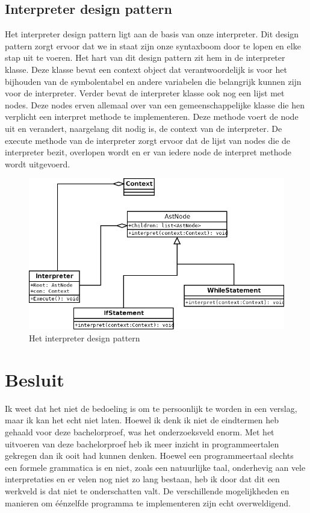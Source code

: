 \documentclass[11pt,a4paper]{article}
\begin{document}
\subsection{Interpreter design pattern}
Het interpreter design pattern ligt aan de basis van onze interpreter. Dit design pattern zorgt ervoor dat we in staat zijn onze syntaxboom door te lopen en elke stap uit te voeren. Het hart van dit design pattern zit hem in de interpreter klasse. Deze klasse bevat een context object dat verantwoordelijk is voor het bijhouden van de symbolentabel en andere variabelen die belangrijk kunnen zijn voor de interpreter. Verder bevat de interpreter klasse ook nog een lijst met nodes. Deze nodes erven allemaal over van een gemeenschappelijke klasse die hen verplicht een interpret methode te implementeren. Deze methode voert de node uit en verandert, naargelang dit nodig is, de context van de interpreter. De execute methode van de interpreter zorgt ervoor dat de lijst van nodes die de interpreter bezit, overlopen wordt en er van iedere node de interpret methode wordt uitgevoerd.

\begin{figure}[ht]
\centering
\includegraphics[width=\textwidth]{afbeeldingen/interpreter_small}
\caption{Het interpreter design pattern}
\end{figure}

\section{Besluit}
Ik weet dat het niet de bedoeling is om te persoonlijk te worden in een verslag, maar ik kan het echt niet laten. Hoewel ik denk ik niet de eindtermen heb gehaald voor deze bachelorproef, was het onderzoeksveld enorm. Met het uitvoeren van deze bachelorproef heb ik meer inzicht in programmeertalen gekregen dan ik ooit had kunnen denken. Hoewel een programmeertaal slechts een formele grammatica is en niet, zoals een natuurlijke taal, onderhevig aan vele interpretaties en er velen nog niet zo lang bestaan, heb ik door dat dit een werkveld is dat niet te onderschatten valt. De verschillende mogelijkheden en manieren om éénzelfde programma te implementeren zijn echt overweldigend.
\end{document}
